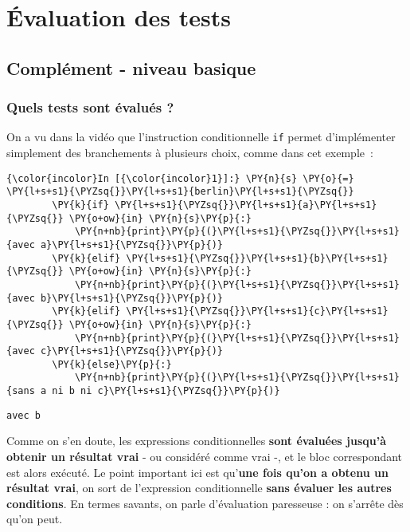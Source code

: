     \hypertarget{uxe9valuation-des-tests}{%
\section{Évaluation des tests}\label{uxe9valuation-des-tests}}

    \hypertarget{compluxe9ment---niveau-basique}{%
\subsection{Complément - niveau
basique}\label{compluxe9ment---niveau-basique}}

    \hypertarget{quels-tests-sont-uxe9valuuxe9s}{%
\subsubsection{Quels tests sont évalués
?}\label{quels-tests-sont-uxe9valuuxe9s}}

    On a vu dans la vidéo que l'instruction conditionnelle \texttt{if}
permet d'implémenter simplement des branchements à plusieurs choix,
comme dans cet exemple~:

    \begin{Verbatim}[commandchars=\\\{\}]
{\color{incolor}In [{\color{incolor}1}]:} \PY{n}{s} \PY{o}{=} \PY{l+s+s1}{\PYZsq{}}\PY{l+s+s1}{berlin}\PY{l+s+s1}{\PYZsq{}}
        \PY{k}{if} \PY{l+s+s1}{\PYZsq{}}\PY{l+s+s1}{a}\PY{l+s+s1}{\PYZsq{}} \PY{o+ow}{in} \PY{n}{s}\PY{p}{:}
            \PY{n+nb}{print}\PY{p}{(}\PY{l+s+s1}{\PYZsq{}}\PY{l+s+s1}{avec a}\PY{l+s+s1}{\PYZsq{}}\PY{p}{)}
        \PY{k}{elif} \PY{l+s+s1}{\PYZsq{}}\PY{l+s+s1}{b}\PY{l+s+s1}{\PYZsq{}} \PY{o+ow}{in} \PY{n}{s}\PY{p}{:}
            \PY{n+nb}{print}\PY{p}{(}\PY{l+s+s1}{\PYZsq{}}\PY{l+s+s1}{avec b}\PY{l+s+s1}{\PYZsq{}}\PY{p}{)}
        \PY{k}{elif} \PY{l+s+s1}{\PYZsq{}}\PY{l+s+s1}{c}\PY{l+s+s1}{\PYZsq{}} \PY{o+ow}{in} \PY{n}{s}\PY{p}{:}
            \PY{n+nb}{print}\PY{p}{(}\PY{l+s+s1}{\PYZsq{}}\PY{l+s+s1}{avec c}\PY{l+s+s1}{\PYZsq{}}\PY{p}{)}
        \PY{k}{else}\PY{p}{:}
            \PY{n+nb}{print}\PY{p}{(}\PY{l+s+s1}{\PYZsq{}}\PY{l+s+s1}{sans a ni b ni c}\PY{l+s+s1}{\PYZsq{}}\PY{p}{)}
\end{Verbatim}


    \begin{Verbatim}[commandchars=\\\{\}]
avec b

    \end{Verbatim}

    Comme on s'en doute, les expressions conditionnelles \textbf{sont
évaluées jusqu'à obtenir un résultat vrai} - ou considéré comme vrai -,
et le bloc correspondant est alors exécuté. Le point important ici est
qu'\textbf{une fois qu'on a obtenu un résultat vrai}, on sort de
l'expression conditionnelle \textbf{sans évaluer les autres conditions}.
En termes savants, on parle d'évaluation paresseuse : on s'arrête dès
qu'on peut.\\

